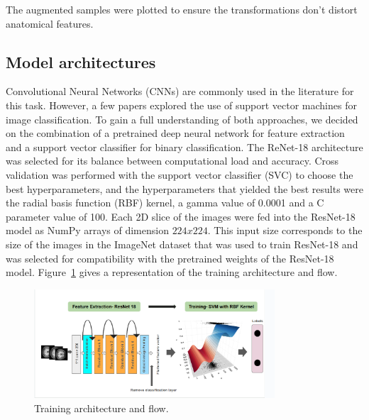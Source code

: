 \begin{itemize}
\end{itemize}

The augmented samples were plotted to ensure the transformations don't distort anatomical features.

%
\subsection{Model architectures}

Convolutional Neural Networks (CNNs) are commonly used in the literature for this task. However, a few papers explored the use of support vector machines for image classification. To gain a full understanding of both approaches, we decided on the combination of a pretrained deep neural network for feature extraction and a support vector classifier for binary classification. The ReNet-18 architecture was selected for its balance between computational load and accuracy. Cross validation was performed with the support vector classifier (SVC) to choose the best hyperparameters, and the hyperparameters that yielded the best results were the radial basis function (RBF) kernel, a gamma value of 0.0001 and a C parameter value of 100. Each 2D slice of the images were fed into the ResNet-18 model as NumPy arrays of dimension $224x224$. This input size corresponds to the size of the images in the ImageNet dataset that was used to train ResNet-18 and was selected for compatibility with the pretrained weights of the ResNet-18 model. Figure~\ref{fig:training_architecture} gives a representation of the training architecture and flow.
%
\begin{figure}
    \centering
    \includegraphics[width=0.8\textwidth]{./figs/model_architecture.png} %
    \caption{Training architecture and flow.}\label{fig:training_architecture}
\end{figure}

